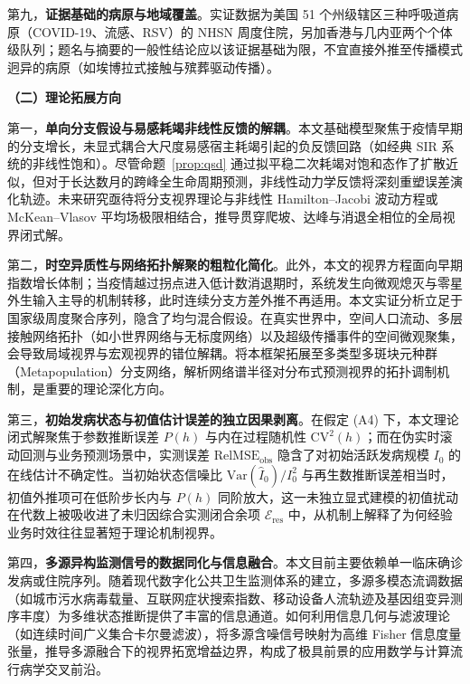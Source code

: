\documentclass[10pt,a4paper]{article}
\theoremstyle{plain}
\theoremstyle{definition}
\begin{document}
{\sloppy 第九，\textbf{证据基础的病原与地域覆盖}。实证数据为美国 51 个州级辖区三种呼吸道病原（COVID-19、流感、RSV）的 NHSN 周度住院，另加香港与几内亚两个个体级队列；题名与摘要的一般性结论应以该证据基础为限，不宜直接外推至传播模式迥异的病原（如埃博拉式接触与殡葬驱动传播）。\par}

\noindent\textbf{（二）理论拓展方向}

第一，\textbf{单向分支假设与易感耗竭非线性反馈的解耦}。本文基础模型聚焦于疫情早期的分支增长，未显式耦合大尺度易感宿主耗竭引起的负反馈回路（如经典 SIR 系统的非线性饱和）。尽管命题~\ref{prop:qsd} 通过拟平稳二次耗竭对饱和态作了扩散近似，但对于长达数月的跨峰全生命周期预测，非线性动力学反馈将深刻重塑误差演化轨迹。未来研究亟待将分支视界理论与非线性 Hamilton--Jacobi 波动方程或 McKean--Vlasov 平均场极限相结合，推导贯穿爬坡、达峰与消退全相位的全局视界闭式解。

第二，\textbf{时空异质性与网络拓扑解聚的粗粒化简化}。此外，本文的视界方程面向早期指数增长体制；当疫情越过拐点进入低计数消退期时，系统发生向微观熄灭与零星外生输入主导的机制转移\citep{parag2026threshold}，此时连续分支方差外推不再适用。本文实证分析立足于国家级周度聚合序列，隐含了均匀混合假设。在真实世界中，空间人口流动、多层接触网络拓扑（如小世界网络与无标度网络）以及超级传播事件的空间微观聚集，会导致局域视界与宏观视界的错位解耦。将本框架拓展至多类型多斑块元种群（Metapopulation）分支网络，解析网络谱半径对分布式预测视界的拓扑调制机制，是重要的理论深化方向。

第三，\textbf{初始发病状态与初值估计误差的独立因果剥离}。在假定 (A4) 下，本文理论闭式解聚焦于参数推断误差 $P(h)$ 与内在过程随机性 $\text{CV}^2(h)$；而在伪实时滚动回测与业务预测场景中，实测误差 $\text{RelMSE}_{\text{obs}}$ 隐含了对初始活跃发病规模 $I_0$ 的在线估计不确定性。当初始状态信噪比 $\text{Var}(\hat{I}_0)/I_0^2$ 与再生数推断误差相当时，初值外推项可在低阶步长内与 $P(h)$ 同阶放大，这一未独立显式建模的初值扰动在代数上被吸收进了未归因综合实测闭合余项 $\mathcal{E}_{\text{res}}$ 中，从机制上解释了为何经验业务时效往往显著短于理论机制视界。

第四，\textbf{多源异构监测信号的数据同化与信息融合}。本文目前主要依赖单一临床确诊发病或住院序列。随着现代数字化公共卫生监测体系的建立，多源多模态流调数据（如城市污水病毒载量、互联网症状搜索指数、移动设备人流轨迹及基因组变异测序丰度）为多维状态推断提供了丰富的信息通道。如何利用信息几何与滤波理论（如连续时间广义集合卡尔曼滤波），将多源含噪信号映射为高维 Fisher 信息度量张量，推导多源融合下的视界拓宽增益边界，构成了极具前景的应用数学与计算流行病学交叉前沿。
\end{document}
